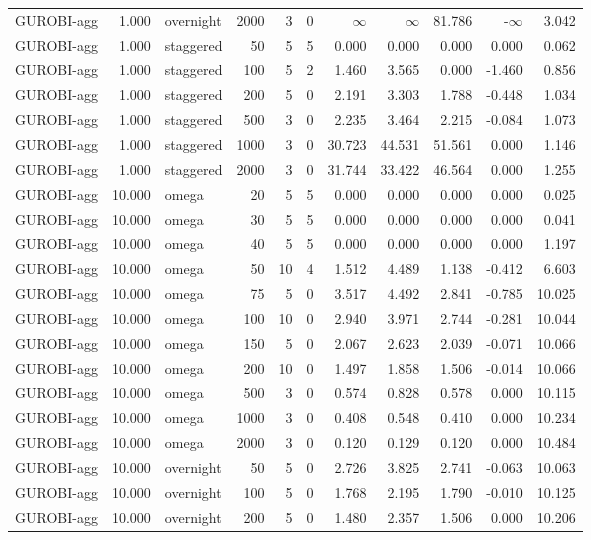 \begin{table}[htbp]
\begin{tabular}{lrlrrlrrrrr}
GUROBI-agg & 1.000 & overnight & 2000 & 3 & 0 & $\infty$ & $\infty$ & 81.786 & -$\infty$ & 3.042 \\
GUROBI-agg & 1.000 & staggered & 50 & 5 & 5 & 0.000 & 0.000 & 0.000 & 0.000 & 0.062 \\
GUROBI-agg & 1.000 & staggered & 100 & 5 & 2 & 1.460 & 3.565 & 0.000 & -1.460 & 0.856 \\
GUROBI-agg & 1.000 & staggered & 200 & 5 & 0 & 2.191 & 3.303 & 1.788 & -0.448 & 1.034 \\
GUROBI-agg & 1.000 & staggered & 500 & 3 & 0 & 2.235 & 3.464 & 2.215 & -0.084 & 1.073 \\
GUROBI-agg & 1.000 & staggered & 1000 & 3 & 0 & 30.723 & 44.531 & 51.561 & 0.000 & 1.146 \\
GUROBI-agg & 1.000 & staggered & 2000 & 3 & 0 & 31.744 & 33.422 & 46.564 & 0.000 & 1.255 \\
GUROBI-agg & 10.000 & omega & 20 & 5 & 5 & 0.000 & 0.000 & 0.000 & 0.000 & 0.025 \\
GUROBI-agg & 10.000 & omega & 30 & 5 & 5 & 0.000 & 0.000 & 0.000 & 0.000 & 0.041 \\
GUROBI-agg & 10.000 & omega & 40 & 5 & 5 & 0.000 & 0.000 & 0.000 & 0.000 & 1.197 \\
GUROBI-agg & 10.000 & omega & 50 & 10 & 4 & 1.512 & 4.489 & 1.138 & -0.412 & 6.603 \\
GUROBI-agg & 10.000 & omega & 75 & 5 & 0 & 3.517 & 4.492 & 2.841 & -0.785 & 10.025 \\
GUROBI-agg & 10.000 & omega & 100 & 10 & 0 & 2.940 & 3.971 & 2.744 & -0.281 & 10.044 \\
GUROBI-agg & 10.000 & omega & 150 & 5 & 0 & 2.067 & 2.623 & 2.039 & -0.071 & 10.066 \\
GUROBI-agg & 10.000 & omega & 200 & 10 & 0 & 1.497 & 1.858 & 1.506 & -0.014 & 10.066 \\
GUROBI-agg & 10.000 & omega & 500 & 3 & 0 & 0.574 & 0.828 & 0.578 & 0.000 & 10.115 \\
GUROBI-agg & 10.000 & omega & 1000 & 3 & 0 & 0.408 & 0.548 & 0.410 & 0.000 & 10.234 \\
GUROBI-agg & 10.000 & omega & 2000 & 3 & 0 & 0.120 & 0.129 & 0.120 & 0.000 & 10.484 \\
GUROBI-agg & 10.000 & overnight & 50 & 5 & 0 & 2.726 & 3.825 & 2.741 & -0.063 & 10.063 \\
GUROBI-agg & 10.000 & overnight & 100 & 5 & 0 & 1.768 & 2.195 & 1.790 & -0.010 & 10.125 \\
GUROBI-agg & 10.000 & overnight & 200 & 5 & 0 & 1.480 & 2.357 & 1.506 & 0.000 & 10.206 \\

\end{tabular}
\end{table}
